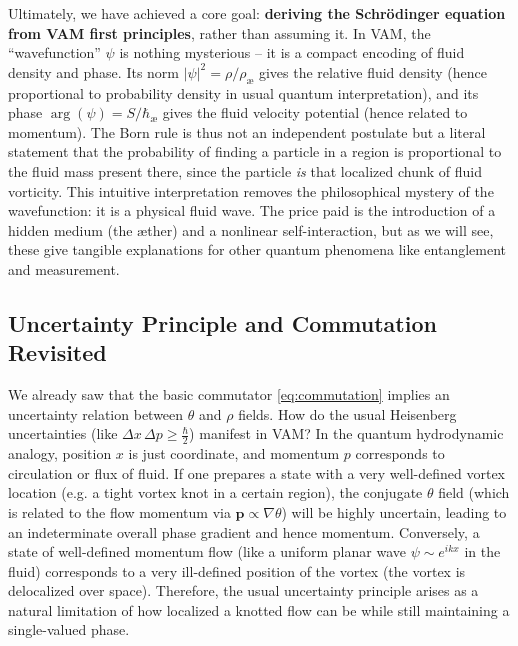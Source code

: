\documentclass[preprint]{revtex4-2}
\begin{document}
    Ultimately, we have achieved a core goal: \textbf{deriving the Schrödinger equation from VAM first principles}, rather than assuming it. In VAM, the “wavefunction” $\psi$ is nothing mysterious -- it is a compact encoding of fluid density and phase. Its norm $|\psi|^2 = \rho/\rho_{\text{\ae}}$ gives the relative fluid density (hence proportional to probability density in usual quantum interpretation), and its phase $\arg(\psi) = S/\hbar_{\text{\ae}}$ gives the fluid velocity potential (hence related to momentum). The Born rule is thus not an independent postulate but a literal statement that the probability of finding a particle in a region is proportional to the fluid mass present there, since the particle \emph{is} that localized chunk of fluid vorticity. This intuitive interpretation removes the philosophical mystery of the wavefunction: it is a physical fluid wave. The price paid is the introduction of a hidden medium (the æther) and a nonlinear self-interaction, but as we will see, these give tangible explanations for other quantum phenomena like entanglement and measurement.

    \subsection{Uncertainty Principle and Commutation Revisited}
    We already saw that the basic commutator \eqref{eq:commutation} implies an uncertainty relation between $\theta$ and $\rho$ fields. How do the usual Heisenberg uncertainties (like $\Delta x\,\Delta p \ge \frac{\hbar}{2}$) manifest in VAM? In the quantum hydrodynamic analogy, position $x$ is just coordinate, and momentum $p$ corresponds to circulation or flux of fluid. If one prepares a state with a very well-defined vortex location (e.g. a tight vortex knot in a certain region), the conjugate $\theta$ field (which is related to the flow momentum via $\mathbf{p}\propto \nabla \theta$) will be highly uncertain, leading to an indeterminate overall phase gradient and hence momentum. Conversely, a state of well-defined momentum flow (like a uniform planar wave $\psi \sim e^{i k x}$ in the fluid) corresponds to a very ill-defined position of the vortex (the vortex is delocalized over space). Therefore, the usual uncertainty principle arises as a natural limitation of how localized a knotted flow can be while still maintaining a single-valued phase.
\end{document}
